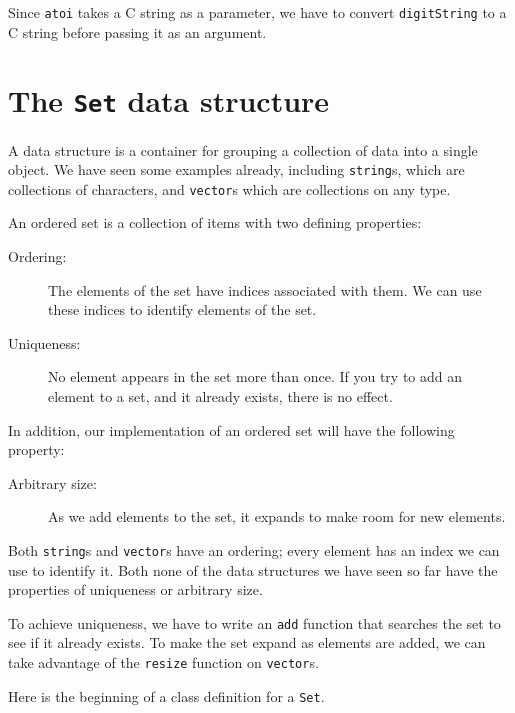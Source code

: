 Since {\tt atoi} takes a C string as a parameter, we have
to convert {\tt digitString} to a C string before passing it
as an argument.

\section{The {\tt Set} data structure}

A data structure is a container for grouping a collection
of data into a single object.  We have seen some examples already,
including {\tt string}s, which are collections of characters,
and {\tt vector}s which are collections on any type.

An ordered set is a collection of items with two defining
properties:

\begin{description}

\item[Ordering:] The elements of the set have indices associated
with them.  We can use these indices to identify elements of the set.

\item[Uniqueness:] No element appears in the set more than once.
If you try to add an element to a set, and it already exists, there
is no effect.

\end{description}

In addition, our implementation of an ordered set will have the
following property:

\begin{description}

\item[Arbitrary size:] As we add elements to the set, it expands
to make room for new elements.

\end{description}

Both {\tt string}s and {\tt vector}s have an ordering; every
element has an index we can use to identify it.  Both none of
the data structures we have seen so far have the properties of
uniqueness or arbitrary size.


To achieve uniqueness, we have to write an {\tt add} function
that searches the set to see if it already exists.  To make the
set expand as elements are added, we can take advantage of the
{\tt resize} function on {\tt vector}s.

Here is the beginning of a class definition for a {\tt Set}.

